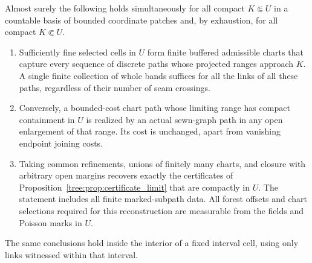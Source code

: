 \begin{lemma}\label{tree:lem:chart_reconstruction}
Almost surely the following holds simultaneously for all compact
$K\Subset U$ in a countable basis of bounded coordinate patches and,
by exhaustion, for all compact $K\Subset U$.
\begin{enumerate}
\item Sufficiently fine selected cells in $U$ form finite buffered
admissible charts that capture every sequence of discrete paths whose
projected ranges approach $K$.  A single finite collection of whole
bands suffices for all the links of all these paths, regardless of
their number of seam crossings.
\item Conversely, a bounded-cost chart path whose limiting range has
compact containment in $U$ is realized by an actual sewn-graph path
in any open enlargement of that range.  Its cost is unchanged, apart
from vanishing endpoint joining costs.
\item Taking common refinements, unions of finitely many charts, and
closure with arbitrary open margins recovers exactly the certificates
of Proposition~\ref{tree:prop:certificate_limit} that are compactly in $U$.
The statement includes all finite marked-subpath data.  All forest
offsets and chart selections required for this reconstruction are
measurable from the fields and Poisson marks in $U$.
\end{enumerate}
The same conclusions hold inside the interior of a fixed interval cell,
using only links witnessed within that interval.
\end{lemma}

